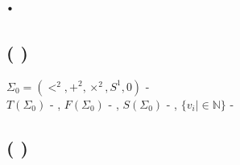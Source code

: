 %

\section{\textcyr{\CYRF\cyro\cyrr\cyrm\cyra\cyrl\cyrsftsn\cyrn\cyra\cyrya}
\textcyr{\cyra\cyrr\cyri\cyrf\cyrm\cyre\cyrt\cyri\cyrk\cyra} \textcyr{\CYRP\cyre\cyra\cyrn\cyro}.
\textcyr{\CYRN\cyre\cyrr\cyra\cyrz\cyrr\cyre\cyrsh\cyri\cyrm\cyrery\cyre}
\textcyr{\cyrp\cyrr\cyro\cyrb\cyrl\cyre\cyrm\cyrery}}

\subsection{\textcyr{\CYRO\cyrp\cyrr\cyre\cyrd\cyre\cyrl\cyre\cyrn\cyri\cyre}
(\textcyr{\CYRA\cyrr\cyri\cyrf\cyrm\cyre\cyrt\cyri\cyrk\cyra} \textcyr{\CYRP\cyre\cyra\cyrn\cyro})}

$\Sigma_{0}=(<^{2},+^{2},\times^{2},S^{1},0)$ - \textcyr{\cyrs\cyri\cyrg\cyrn\cyra\cyrt\cyru\cyrr\cyra}
\textcyr{\cyra\cyrr\cyri\cyrf\cyrm\cyre\cyrt\cyri\cyrk\cyri} \textcyr{\CYRP\cyre\cyra\cyrn\cyro}\\
$T(\Sigma_{0})$ - \textcyr{\cyrm\cyrn\cyro\cyrzh\cyre\cyrs\cyrt\cyrv\cyro}
\textcyr{\cyrt\cyre\cyrr\cyrm\cyro\cyrv}, $F(\Sigma_{0})$ - \textcyr{\cyrm\cyrn\cyro\cyrzh\cyre\cyrs\cyrt\cyrv\cyro}
\textcyr{\cyrf\cyro\cyrr\cyrm\cyru\cyrl}, $S(\Sigma_{0})$ - \textcyr{\cyrm\cyrn\cyro\cyrzh\cyre\cyrs\cyrt\cyrv\cyro}
\textcyr{\cyrp\cyrr\cyre\cyrd\cyrl\cyro\cyrzh\cyre\cyrn\cyri\cyrishrt},
$\{v_{i}|\in\mathbb{N}\}$ - \textcyr{\cyrp\cyre\cyrr\cyre\cyrm\cyre\cyrn\cyrn\cyrery\cyre}

\subsection{\textcyr{\CYRO\cyrp\cyrr\cyre\cyrd\cyre\cyrl\cyre\cyrn\cyri\cyre}
(\textcyr{\CYRG\cyryo\cyrd\cyre\cyrl\cyre\cyrv\cyrs\cyrk\cyra\cyrya}
\textcyr{\cyrn\cyru\cyrm\cyre\cyrr\cyra\cyrc\cyri\cyrya})}

